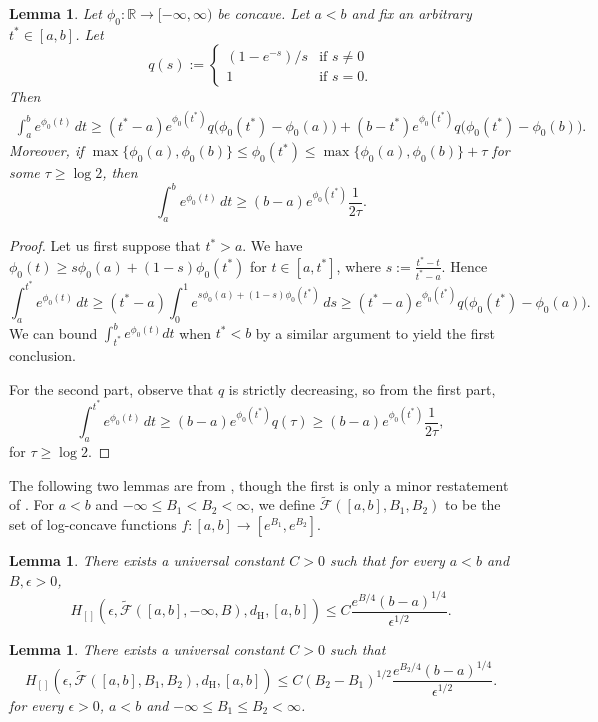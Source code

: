 \documentclass[a4paper,12pt]{article}
\newtheorem{lemma}[theorem]{Lemma}
\begin{document}
\begin{lemma}
  \label{lem:integral_approximation}
Let $\phi_0:\mathbb{R} \rightarrow [-\infty,\infty)$ be concave. Let $a < b$ and fix an arbitrary $t^* \in [a, b]$.  Let
\[
q(s) := \left\{ \begin{array}{ll} (1 - e^{-s})/s & \mbox{if $s \neq 0$} \\
1 & \mbox{if $s = 0$.} \end{array} \right.
\]
Then
\begin{align*}
    \int_a^b e^{\phi_0(t)} \, dt \geq (t^*-a) e^{\phi_0(t^*)} q\bigl(\phi_0(t^*) - \phi_0(a)\bigr) + (b - t^*) e^{\phi_0(t^*)}q\bigl(\phi_0(t^*) - \phi_0(b)\bigr).
  \end{align*}
Moreover, if $\max\{\phi_0(a), \phi_0(b)\} \leq \phi_0(t^*) \leq \max\{\phi_0(a), \phi_0(b)\} + \tau$ for some $\tau \geq \log 2$, then
  \[
  \int_a^b e^{\phi_0(t)} \, dt \geq (b-a) e^{\phi_0(t^*)} \frac{1}{2 \tau}.
  \]
\end{lemma}
\begin{proof}
  Let us first suppose that $t^* > a$. We have $\phi_0(t) \geq s \phi_0(a) + (1 - s) \phi_0(t^*)$ for $t \in [a,t^*]$, where $s := \frac{t^* - t}{t^* - a}$.  Hence
  \[
    \int_a^{t^*} e^{\phi_0(t)} \, dt \geq (t^* - a) \int_0^1 e^{ s \phi_0(a) + (1 - s) \phi_0(t^*)} \, ds \geq (t^*- a)e^{\phi_0(t^*)}q\bigl(\phi_0(t^*) - \phi_0(a)\bigr).
  \]
We can bound $\int_{t^*}^b e^{\phi_0(t)} dt$ when $t^* < b$ by a similar argument to yield the first conclusion. 

For the second part, observe that $q$ is strictly decreasing, so from the first part,
\[
\int_a^{t^*} e^{\phi_0(t)} \, dt \geq (b-a)e^{\phi_0(t^*)}q(\tau) \geq (b-a)e^{\phi_0(t^*)}\frac{1}{2\tau},
\]
for $\tau \geq \log 2$.
\end{proof}

The following two lemmas are from \citet{kim2016adaptation}, though the first is only a minor restatement of \citet[][Theorem~4.1]{doss2016global}. For $a < b$ and $-\infty \leq B_1 < B_2 < \infty$, we define $\tilde{\mathcal{F}}([a,b], B_1, B_2)$ to be the set of log-concave functions $f:[a,b] \rightarrow [e^{B_1},e^{B_2}]$. 
\begin{lemma}
  \label{Prop:SegmentBracket1}
There exists a universal constant $C > 0$ such that for every $a < b$ and $B, \epsilon > 0$,
\[
H_{[]}( \epsilon, \tilde{\mathcal{F}}([a,b],-\infty, B), d_{\mathrm{H}}, [a,b]) \leq C \frac{ e^{B/4} (b-a)^{1/4}}{\epsilon^{1/2}}.
\]
\end{lemma}
\begin{lemma}
  \label{Prop:SegmentBracket2}
There exists a universal constant $C > 0$ such that 
\[
H_{[]}( \epsilon, \tilde{\mathcal{F}}([a,b],B_1,B_2), d_{\mathrm{H}}, [a,b]) \leq C (B_2 - B_1)^{1/2} \frac{ e^{B_2/4} (b-a)^{1/4}}{\epsilon^{1/2}}.
\]
for every $\epsilon > 0$, $a < b$ and $-\infty \leq B_1 \leq B_2 < \infty$. 
\end{lemma}
\end{document}
